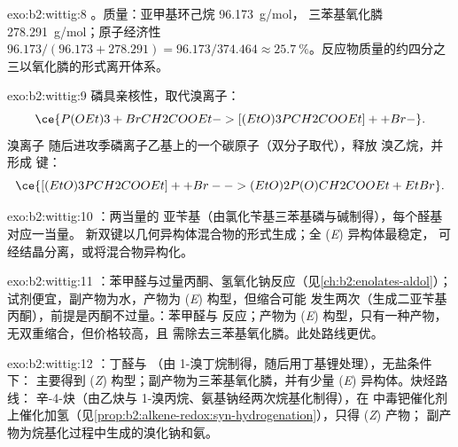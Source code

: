 \begin{solution}{exo:b2:wittig:8}
。质量：亚甲基环己烷 \qty{96.173}{g/mol}，
三苯基氧化膦 \qty{278.291}{g/mol}；原子经济性 $96.173/(96.173 + 278.291) =
96.173/374.464 \approx 25.7~\%$。反应物质量的约四分之三以氧化膦的形式离开体系。
\end{solution}

\begin{solution}{exo:b2:wittig:9}
磷具亲核性，取代溴离子：
\begin{equation*}
\ce{P(OEt)3 + BrCH2COOEt -> [(EtO)3PCH2COOEt]+ + Br-}.
\end{equation*}
溴离子
随后进攻季磷离子乙基上的一个碳原子（双分子取代），释放
溴乙烷，并形成  键：
\begin{equation*}
\ce{[(EtO)3PCH2COOEt]+ + Br- -> (EtO)2P(O)CH2COOEt + EtBr}.
\end{equation*}
\end{solution}

\begin{solution}{exo:b2:wittig:10}
：两当量的
亚苄基（由氯化苄基三苯基磷与碱制得），每个醛基对应一当量。
新双键以几何异构体混合物的形式生成；全 (\textit{E}) 异构体最稳定，
可经结晶分离，或将混合物异构化。
\end{solution}

\begin{solution}{exo:b2:wittig:11}
：苯甲醛与过量丙酮、氢氧化钠反应（见\cref{ch:b2:enolates-aldol}）；
试剂便宜，副产物为水，产物为 (\textit{E}) 构型，但缩合可能
发生两次（生成二亚苄基丙酮），前提是丙酮不过量。：苯甲醛与
 反应；产物为 (\textit{E}) 构型，只有一种产物，无双重缩合，但价格较高，且
需除去三苯基氧化膦。此处路线更优。
\end{solution}

\begin{solution}{exo:b2:wittig:12}
：丁醛与 （由 1-溴丁烷制得，随后用丁基锂处理），无盐条件下：
主要得到 (\textit{Z}) 构型；副产物为三苯基氧化膦，并有少量 (\textit{E}) 异构体。炔烃路线：
辛-4-炔（由乙炔与 1-溴丙烷、氨基钠经两次烷基化制得），在
中毒钯催化剂上催化加氢（见\cref{prop:b2:alkene-redox:syn-hydrogenation}），只得 (\textit{Z}) 产物；
副产物为烷基化过程中生成的溴化钠和氨。
\end{solution}


